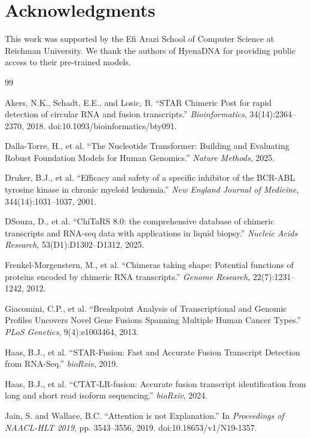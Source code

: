 \documentclass{bioinfo}
\begin{document}
\section*{Acknowledgments}
This work was supported by the Efi Arazi School of Computer Science at Reichman University. We thank the authors of HyenaDNA for providing public access to their pre-trained models.

\begin{thebibliography}{99}

Akers, N.K., Schadt, E.E., and Losic, B. ``STAR Chimeric Post for rapid detection of circular RNA and fusion transcripts.''
\textit{Bioinformatics}, 34(14):2364--2370, 2018. doi:10.1093/bioinformatics/bty091.

Dalla-Torre, H., et al. ``The Nucleotide Transformer: Building and Evaluating Robust Foundation Models for Human Genomics.''
\textit{Nature Methods}, 2025.

Druker, B.J., et al. ``Efficacy and safety of a specific inhibitor of the BCR-ABL tyrosine kinase in chronic myeloid leukemia.''
\textit{New England Journal of Medicine}, 344(14):1031--1037, 2001.

DSouza, D., et al. ``ChiTaRS 8.0: the comprehensive database of chimeric transcripts and RNA-seq data with applications in liquid biopsy.''
\textit{Nucleic Acids Research}, 53(D1):D1302--D1312, 2025.

Frenkel-Morgenstern, M., et al. ``Chimeras taking shape: Potential functions of proteins encoded by chimeric RNA transcripts.''
\textit{Genome Research}, 22(7):1231--1242, 2012.

Giacomini, C.P., et al. ``Breakpoint Analysis of Transcriptional and Genomic Profiles Uncovers Novel Gene Fusions Spanning Multiple Human Cancer Types.''
\textit{PLoS Genetics}, 9(4):e1003464, 2013.

Haas, B.J., et al. ``STAR-Fusion: Fast and Accurate Fusion Transcript Detection from RNA-Seq.''
\textit{bioRxiv}, 2019.

Haas, B.J., et al. ``CTAT-LR-fusion: Accurate fusion transcript identification from long and short read isoform sequencing.''
\textit{bioRxiv}, 2024.

Jain, S. and Wallace, B.C. ``Attention is not Explanation.''
In \textit{Proceedings of NAACL-HLT 2019}, pp. 3543--3556, 2019. doi:10.18653/v1/N19-1357.


\end{thebibliography}
\end{document}
